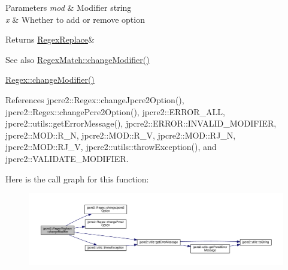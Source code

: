 \begin{DoxyParams}{Parameters}
{\em mod} & Modifier string \\
\hline
{\em x} & Whether to add or remove option \\
\hline
\end{DoxyParams}
\begin{DoxyReturn}{Returns}
\hyperlink{classjpcre2_1_1RegexReplace}{Regex\+Replace}\& 
\end{DoxyReturn}
\begin{DoxySeeAlso}{See also}
\hyperlink{classjpcre2_1_1RegexMatch_a877be3123d789020d259939bc79e8cfe}{Regex\+Match\+::change\+Modifier()} 

\hyperlink{classjpcre2_1_1Regex_a9ab3efed9819a51225456e6d8487de56}{Regex\+::change\+Modifier()} 
\end{DoxySeeAlso}


References jpcre2\+::\+Regex\+::change\+Jpcre2\+Option(), jpcre2\+::\+Regex\+::change\+Pcre2\+Option(), jpcre2\+::\+E\+R\+R\+O\+R\+\_\+\+A\+LL, jpcre2\+::utils\+::get\+Error\+Message(), jpcre2\+::\+E\+R\+R\+O\+R\+::\+I\+N\+V\+A\+L\+I\+D\+\_\+\+M\+O\+D\+I\+F\+I\+ER, jpcre2\+::\+M\+O\+D\+::\+R\+\_\+N, jpcre2\+::\+M\+O\+D\+::\+R\+\_\+V, jpcre2\+::\+M\+O\+D\+::\+R\+J\+\_\+N, jpcre2\+::\+M\+O\+D\+::\+R\+J\+\_\+V, jpcre2\+::utils\+::throw\+Exception(), and jpcre2\+::\+V\+A\+L\+I\+D\+A\+T\+E\+\_\+\+M\+O\+D\+I\+F\+I\+ER.



Here is the call graph for this function\+:\nopagebreak
\begin{figure}[H]
\begin{center}
\leavevmode
\includegraphics[width=350pt]{classjpcre2_1_1RegexReplace_a0a2dc39fc28e6f7fe0a5d638f5891bdb_cgraph}
\end{center}
\end{figure}


